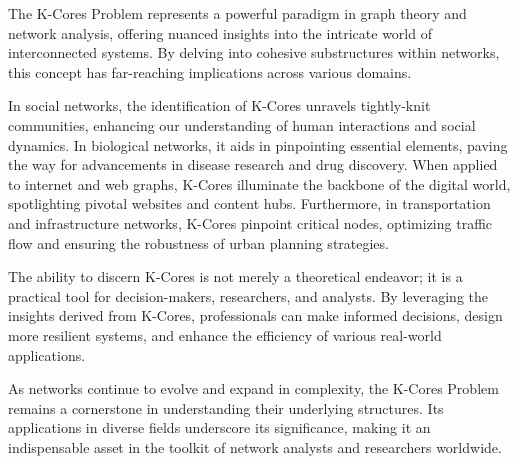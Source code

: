 \label{Conclusion}

The K-Cores Problem represents a powerful paradigm in graph theory and network analysis, offering nuanced insights into the intricate world of interconnected systems. By delving into cohesive substructures within networks, this concept has far-reaching implications across various domains.

In social networks, the identification of K-Cores unravels tightly-knit communities, enhancing our understanding of human interactions and social dynamics. In biological networks, it aids in pinpointing essential elements, paving the way for advancements in disease research and drug discovery. When applied to internet and web graphs, K-Cores illuminate the backbone of the digital world, spotlighting pivotal websites and content hubs. Furthermore, in transportation and infrastructure networks, K-Cores pinpoint critical nodes, optimizing traffic flow and ensuring the robustness of urban planning strategies.

The ability to discern K-Cores is not merely a theoretical endeavor; it is a practical tool for decision-makers, researchers, and analysts. By leveraging the insights derived from K-Cores, professionals can make informed decisions, design more resilient systems, and enhance the efficiency of various real-world applications.

As networks continue to evolve and expand in complexity, the K-Cores Problem remains a cornerstone in understanding their underlying structures. Its applications in diverse fields underscore its significance, making it an indispensable asset in the toolkit of network analysts and researchers worldwide.
